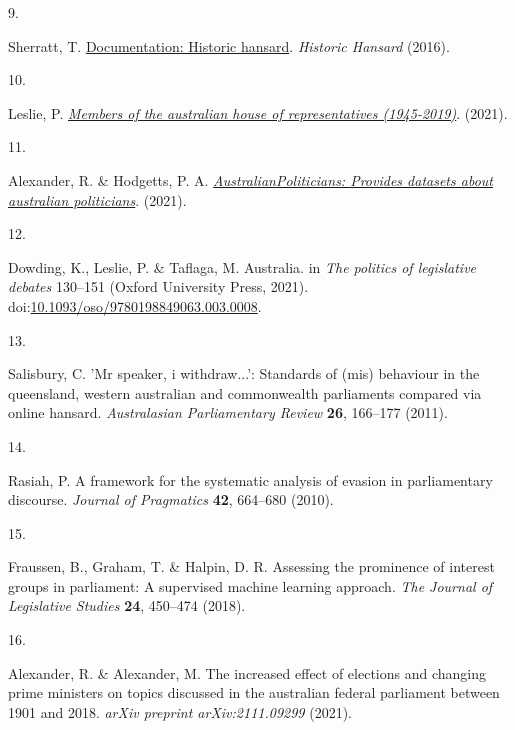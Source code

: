 \documentclass[
  letterpaper,
  DIV=11,
  numbers=noendperiod]{scrartcl}
\newlength{\cslhangindent}
\newlength{\csllabelwidth}
\newlength{\cslentryspacingunit} %
\newenvironment{CSLReferences}[2] %
 {%
  \setlength{\parindent}{0pt}
  \ifodd #1
  \let\oldpar\par
  \def\par{\hangindent=\cslhangindent\oldpar}
  \fi
  \setlength{\parskip}{#2\cslentryspacingunit}
 }%
 {}
\newcommand{\CSLLeftMargin}[1]{\parbox[t]{\csllabelwidth}{#1}}
\newcommand{\CSLRightInline}[1]{\parbox[t]{\linewidth - \csllabelwidth}{#1}\break}
\begin{document}
\begin{CSLReferences}{0}{0}
\leavevmode{}%
\CSLLeftMargin{9. }%
\CSLRightInline{Sherratt, T.
\href{http://timsherratt.org/digital-heritage-handbook/docs/historic-hansard/\#}{Documentation:
Historic hansard}. \emph{Historic Hansard} (2016).}

\leavevmode{}%
\CSLLeftMargin{10. }%
\CSLRightInline{Leslie, P.
\emph{\href{https://github.com/palesl/AustralianHouseOfRepresentatives}{Members
of the australian house of representatives (1945-2019)}}. (2021).}

\leavevmode{}%
\CSLLeftMargin{11. }%
\CSLRightInline{Alexander, R. \& Hodgetts, P. A.
\emph{\href{https://CRAN.R-project.org/package=AustralianPoliticians}{AustralianPoliticians:
Provides datasets about australian politicians}}. (2021).}

\leavevmode{}%
\CSLLeftMargin{12. }%
\CSLRightInline{Dowding, K., Leslie, P. \& Taflaga, M. Australia. in
\emph{The politics of legislative debates} 130--151 (Oxford University
Press, 2021).
doi:\href{https://doi.org/10.1093/oso/9780198849063.003.0008}{10.1093/oso/9780198849063.003.0008}.}

\leavevmode{}%
\CSLLeftMargin{13. }%
\CSLRightInline{Salisbury, C. 'Mr speaker, i withdraw...': Standards of
(mis) behaviour in the queensland, western australian and commonwealth
parliaments compared via online hansard. \emph{Australasian
Parliamentary Review} \textbf{26}, 166--177 (2011).}

\leavevmode{}%
\CSLLeftMargin{14. }%
\CSLRightInline{Rasiah, P. A framework for the systematic analysis of
evasion in parliamentary discourse. \emph{Journal of Pragmatics}
\textbf{42}, 664--680 (2010).}

\leavevmode{}%
\CSLLeftMargin{15. }%
\CSLRightInline{Fraussen, B., Graham, T. \& Halpin, D. R. Assessing the
prominence of interest groups in parliament: A supervised machine
learning approach. \emph{The Journal of Legislative Studies}
\textbf{24}, 450--474 (2018).}

\leavevmode{}%
\CSLLeftMargin{16. }%
\CSLRightInline{Alexander, R. \& Alexander, M. The increased effect of
elections and changing prime ministers on topics discussed in the
australian federal parliament between 1901 and 2018. \emph{arXiv
preprint arXiv:2111.09299} (2021).}


\end{CSLReferences}
\end{document}
